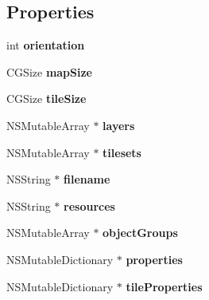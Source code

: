 \subsection*{Properties}
\begin{DoxyCompactItemize}
\item 
\hypertarget{interface_c_c_t_m_x_map_info_a55094daadf463c12dae42c59e6dc71af}{int {\bfseries orientation}}\label{interface_c_c_t_m_x_map_info_a55094daadf463c12dae42c59e6dc71af}

\item 
\hypertarget{interface_c_c_t_m_x_map_info_a0649778ec065a2398570ec93a8eeb70b}{C\-G\-Size {\bfseries map\-Size}}\label{interface_c_c_t_m_x_map_info_a0649778ec065a2398570ec93a8eeb70b}

\item 
\hypertarget{interface_c_c_t_m_x_map_info_a3817235c8a4e298d542e1b3fb7301a8f}{C\-G\-Size {\bfseries tile\-Size}}\label{interface_c_c_t_m_x_map_info_a3817235c8a4e298d542e1b3fb7301a8f}

\item 
\hypertarget{interface_c_c_t_m_x_map_info_aac54b20703b01c135c7ed3c1207a3ed7}{N\-S\-Mutable\-Array $\ast$ {\bfseries layers}}\label{interface_c_c_t_m_x_map_info_aac54b20703b01c135c7ed3c1207a3ed7}

\item 
\hypertarget{interface_c_c_t_m_x_map_info_ac91f061d2acc35d5de638f61816ac739}{N\-S\-Mutable\-Array $\ast$ {\bfseries tilesets}}\label{interface_c_c_t_m_x_map_info_ac91f061d2acc35d5de638f61816ac739}

\item 
\hypertarget{interface_c_c_t_m_x_map_info_a97121fe811584e2eb401bc34428a8712}{N\-S\-String $\ast$ {\bfseries filename}}\label{interface_c_c_t_m_x_map_info_a97121fe811584e2eb401bc34428a8712}

\item 
\hypertarget{interface_c_c_t_m_x_map_info_a88846f7fab569de11090596467fe8fff}{N\-S\-String $\ast$ {\bfseries resources}}\label{interface_c_c_t_m_x_map_info_a88846f7fab569de11090596467fe8fff}

\item 
\hypertarget{interface_c_c_t_m_x_map_info_aa99f870faeeeeace8d4c64fbf254572b}{N\-S\-Mutable\-Array $\ast$ {\bfseries object\-Groups}}\label{interface_c_c_t_m_x_map_info_aa99f870faeeeeace8d4c64fbf254572b}

\item 
\hypertarget{interface_c_c_t_m_x_map_info_a3d8476a3ff1394171895e5349c9e8715}{N\-S\-Mutable\-Dictionary $\ast$ {\bfseries properties}}\label{interface_c_c_t_m_x_map_info_a3d8476a3ff1394171895e5349c9e8715}

\item 
\hypertarget{interface_c_c_t_m_x_map_info_a12f6b0c76c229ba6f65cf95c4ddad414}{N\-S\-Mutable\-Dictionary $\ast$ {\bfseries tile\-Properties}}\label{interface_c_c_t_m_x_map_info_a12f6b0c76c229ba6f65cf95c4ddad414}

\end{DoxyCompactItemize}


